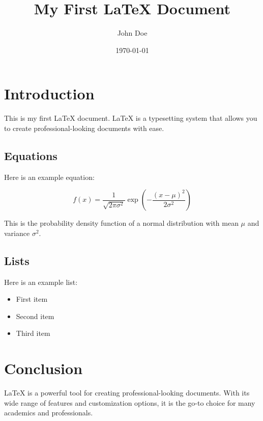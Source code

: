 \documentclass{article} %
\title{My First LaTeX Document} %
\author{John Doe} %
\date{\today} %
\begin{document}

\maketitle %

\section{Introduction} %
This is my first LaTeX document. LaTeX is a typesetting system that allows you to create professional-looking documents with ease.

\subsection{Equations} %
Here is an example equation:

\begin{equation} %
    f(x) = \frac{1}{\sqrt{2\pi\sigma^2}}\exp\left(-\frac{(x-\mu)^2}{2\sigma^2}\right)
\end{equation} %

This is the probability density function of a normal distribution with mean $\mu$ and variance $\sigma^2$.

\subsection{Lists} %
Here is an example list:

\begin{itemize} %
    \item First item
    \item Second item
    \item Third item
\end{itemize} %

\section{Conclusion} %
LaTeX is a powerful tool for creating professional-looking documents. With its wide range of features and customization options, it is the go-to choice for many academics and professionals. 
\end{document}
